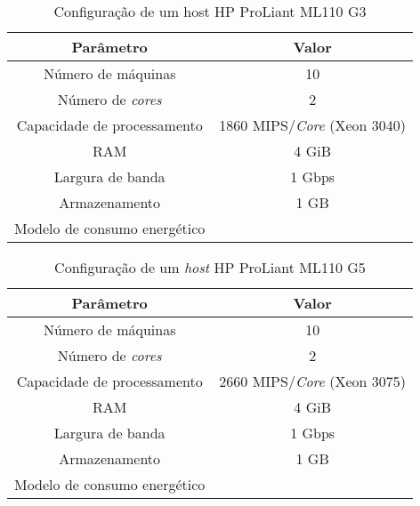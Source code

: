 \begin{table}[ht]
	\centering
    \begin{tabular}{|c|c|}
    \hline
    \textbf{Parâmetro}            & \textbf{Valor}     \\ \hline
    Número de máquinas            & 10                            \\
    Número de \emph{cores}        & 2                             \\
    Capacidade de processamento   & 1860 MIPS/\emph{Core} (Xeon 3040)         \\
    RAM                           & 4 GiB                         \\
    Largura de banda              & 1 Gbps                        \\
    Armazenamento                 & 1 GB                          \\
    Modelo de consumo energético  & \cite{spec:proliant_ml110_g3} \\ \hline
    \end{tabular}
    \caption {Configuração de um host HP ProLiant ML110 G3}
    \label{tab:configuracao_hp_g3}
\end{table}



\begin{table}[ht]
	\centering
    \begin{tabular}{|c|c|}
    \hline
    \textbf{Parâmetro}            & \textbf{Valor}     \\ \hline
    Número de máquinas            & 10                            \\
    Número de \emph{cores}        & 2                             \\
    Capacidade de processamento   & 2660 MIPS/\emph{Core} (Xeon 3075)         \\
    RAM                           & 4 GiB                         \\
    Largura de banda              & 1 Gbps                        \\
    Armazenamento                 & 1 GB                          \\
    Modelo de consumo energético  & \cite{spec:proliant_ml110_g5} \\ \hline
    \end{tabular}
    \caption {Configuração de um \emph{host} HP ProLiant ML110 G5}
    \label{tab:configuracao_hp_g5}
\end{table}

